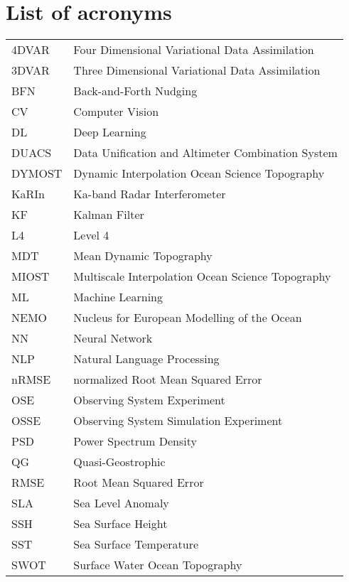 \chapter*{List of acronyms}


\begin{tabular}{ll}
4DVAR & Four Dimensional Variational Data Assimilation\\
3DVAR & Three Dimensional Variational Data Assimilation\\
BFN & Back-and-Forth Nudging\\
CV  & Computer Vision\\
DL & Deep Learning \\
DUACS & Data Unification and Altimeter Combination System\\
DYMOST & Dynamic Interpolation Ocean Science Topography\\
KaRIn & Ka-band Radar Interferometer\\
KF & Kalman Filter \\
L4 & Level 4\\
MDT & Mean Dynamic Topography\\
MIOST & Multiscale Interpolation Ocean Science Topography\\
ML & Machine Learning\\
NEMO & Nucleus for European Modelling of the Ocean\\
NN & Neural Network \\
NLP &  Natural Language Processing\\
nRMSE & normalized Root Mean Squared Error\\
OSE  & Observing System Experiment\\
OSSE  & Observing System Simulation Experiment\\
PSD & Power Spectrum Density\\
QG & Quasi-Geostrophic\\
RMSE & Root Mean Squared Error\\
SLA & Sea Level Anomaly\\
SSH & Sea Surface Height\\
SST & Sea Surface Temperature\\
SWOT &  Surface Water Ocean Topography \\



\end{tabular}
